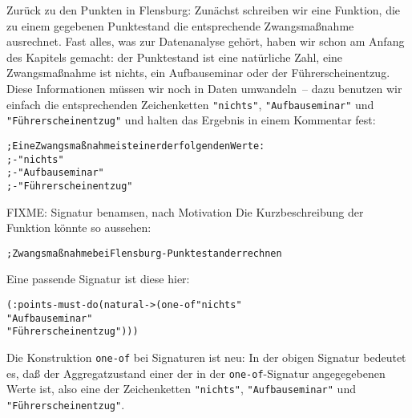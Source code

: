 Zurück zu den Punkten in Flensburg: Zunächst schreiben wir eine
Funktion, die zu einem gegebenen Punktestand die entsprechende
Zwangsmaßnahme ausrechnet.  Fast alles, was zur Datenanalyse gehört,
haben wir schon am Anfang des Kapitels gemacht: der Punktestand ist
eine natürliche Zahl, eine Zwangsmaßnahme ist nichts, ein
Aufbauseminar oder der Führerscheinentzug.  Diese Informationen müssen
wir noch in Daten umwandeln~-- dazu benutzen wir einfach die
entsprechenden Zeichenketten \verb|"nichts"|, \verb|"Aufbauseminar"|
und \verb|"Führerscheinentzug"| und halten das Ergebnis in einem
Kommentar fest:
%
\begin{alltt}
; Eine Zwangsmaßnahme ist einer der folgenden Werte:
; - "nichts"
; - "Aufbauseminar"
; - "Führerscheinentzug"
\end{alltt}
%
FIXME: Signatur benamsen, nach Motivation
%
Die Kurzbeschreibung der Funktion könnte so aussehen:
%
\begin{alltt}
; Zwangsmaßnahme bei Flensburg-Punktestand errechnen
\end{alltt}
%
Eine passende Signatur ist diese
hier:\label{page:points-must-do}
%
\begin{alltt}
(: points-must-do (natural -> (one-of "nichts"
                                      "Aufbauseminar"
                                      "Führerscheinentzug")))
\end{alltt}
%
Die Konstruktion \texttt{one-of}
bei Signaturen ist neu: In der obigen
Signatur bedeutet es, daß der Aggregatzustand einer der in der
\texttt{one-of}-Signatur angegegebenen Werte ist, also eine der
Zeichenketten \verb|"nichts"|, \verb|"Aufbauseminar"| und \verb|"Führerscheinentzug"|.

